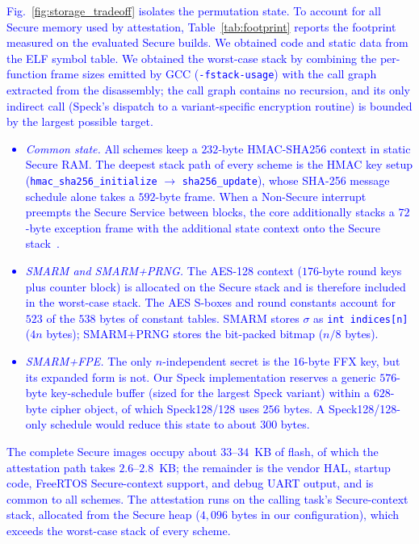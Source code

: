 \documentclass[journal]{IEEEtran}
\newcommand\ben[1]{\textcolor{blue}{#1}}
\newcommand{\rtsmarmone}{SMARM+PRNG\xspace}
\newcommand{\rtsmarmtwo}{SMARM+FPE\xspace}
\begin{document}
\ben{Fig.~\ref{fig:storage_tradeoff} isolates the permutation state.
To account for all Secure memory used by attestation, Table~\ref{tab:footprint} reports the footprint measured on the evaluated Secure builds.
We obtained code and static data from the ELF symbol table.
We obtained the worst-case stack by combining the per-function frame sizes emitted by GCC (\texttt{-fstack-usage}) with the call graph extracted from the disassembly; the call graph contains no recursion, and its only indirect call (Speck's dispatch to a variant-specific encryption routine) is bounded by the largest possible target.
\begin{itemize}
  \item \emph{Common state.} All schemes keep a $232$-byte HMAC-SHA256 context in static Secure RAM.
  The deepest stack path of every scheme is the HMAC key setup (\texttt{hmac\_sha256\_initialize} $\rightarrow$ \texttt{sha256\_update}), whose SHA-256 message schedule alone takes a $592$-byte frame.
  When a Non-Secure interrupt preempts the Secure Service between blocks, the core additionally stacks a $72$-byte exception frame with the additional state context onto the Secure stack~\cite{armv8m-arm}.
  \item \emph{SMARM and \rtsmarmone.} The AES-128 context ($176$-byte round keys plus counter block) is allocated on the Secure stack and is therefore included in the worst-case stack.
  The AES S-boxes and round constants account for $523$ of the $538$ bytes of constant tables.
  SMARM stores $\sigma$ as \texttt{int indices[n]} ($4n$ bytes); \rtsmarmone stores the bit-packed bitmap ($n/8$ bytes).
  \item \emph{\rtsmarmtwo.} The only $n$-independent secret is the $16$-byte FFX key, but its expanded form is not.
  Our Speck implementation reserves a generic $576$-byte key-schedule buffer (sized for the largest Speck variant) within a $628$-byte cipher object, of which Speck128/128 uses $256$ bytes.
  A Speck128/128-only schedule would reduce this state to about $300$ bytes.
\end{itemize}
The complete Secure images occupy about $33$--$34$~KB of flash, of which the attestation path takes $2.6$--$2.8$~KB; the remainder is the vendor HAL, startup code, FreeRTOS Secure-context support, and debug UART output, and is common to all schemes.
The attestation runs on the calling task's Secure-context stack, allocated from the Secure heap ($4{,}096$ bytes in our configuration), which exceeds the worst-case stack of every scheme.}
\end{document}

